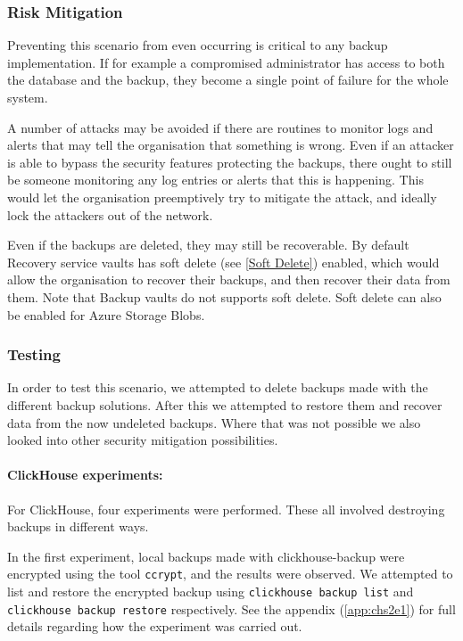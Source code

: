 \subsubsection{Risk Mitigation}
Preventing this scenario from even occurring is critical to any backup implementation. If for example a compromised administrator has access to both the database and the backup, they become a single point of failure for the whole system. 

A number of attacks may be avoided if there are routines to monitor logs and alerts that may tell the organisation that something is wrong. Even if an attacker is able to bypass the security features protecting the backups, there ought to still be someone monitoring any log entries or alerts that this is happening. This would let the organisation preemptively try to mitigate the attack, and ideally lock the attackers out of the network.

Even if the backups are deleted, they may still be recoverable. By default Recovery service vaults has soft delete (see \ref{Soft Delete}) enabled, which would allow the organisation to recover their backups, and then recover their data from them. Note that Backup vaults do not supports soft delete. Soft delete can also be enabled for Azure Storage Blobs.

\subsubsection{Testing} 
In order to test this scenario, we attempted to delete backups made with the different backup solutions.
After this we attempted to restore them and recover data from the now undeleted backups.
Where that was not possible we also looked into other security mitigation possibilities.

\paragraph{ClickHouse experiments:} 

For ClickHouse, four experiments were performed.
These all involved destroying backups in different ways.

In the first experiment, local backups made with clickhouse-backup were encrypted using the tool \texttt{ccrypt}, and the results were observed. We attempted to list and restore the encrypted backup using \texttt{clickhouse backup list} and \texttt{clickhouse backup restore} respectively. See the appendix (\ref{app:chs2e1}) for full details regarding how the experiment was carried out.

